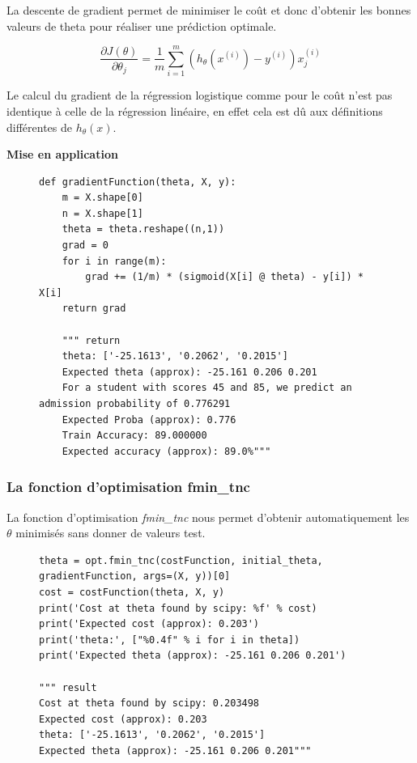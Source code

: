 La descente de gradient permet de minimiser le coût et donc d'obtenir les bonnes valeurs de theta pour réaliser une prédiction optimale.

\begin{equation}\label{eq:descente-gradient}
    \frac{\partial J(\theta)}{\partial \theta_j} = \frac{1}{m} \sum_{i=1}^{m} (h_\theta(x^{(i)}) - y^{(i)}) x_j^{(i)}
\end{equation}

\noindent
 Le calcul du gradient de la régression logistique comme pour le coût n'est pas identique à celle de la régression linéaire, en effet cela est dû aux définitions différentes de \( h_\theta (x) \).

\vspace{.5cm}
    \noindent
    \textbf{Mise en application}
    \vspace{.2cm}

\begin{figure}[!h]
\begin{verbatim}
def gradientFunction(theta, X, y):
    m = X.shape[0]  
    n = X.shape[1]   
    theta = theta.reshape((n,1)) 
    grad = 0
    for i in range(m):
        grad += (1/m) * (sigmoid(X[i] @ theta) - y[i]) * X[i]
    return grad

    """ return 
    theta: ['-25.1613', '0.2062', '0.2015']
    Expected theta (approx): -25.161 0.206 0.201
    For a student with scores 45 and 85, we predict an admission probability of 0.776291
    Expected Proba (approx): 0.776
    Train Accuracy: 89.000000
    Expected accuracy (approx): 89.0%"""
\end{verbatim}   
\end{figure}

\subsubsection{La fonction d'optimisation fmin\_tnc}

La fonction d'optimisation \textit{fmin\_tnc} nous permet d'obtenir automatiquement les $\theta$ minimisés sans donner de valeurs test. 

\begin{figure}[!h]
\begin{verbatim}
theta = opt.fmin_tnc(costFunction, initial_theta, gradientFunction, args=(X, y))[0]
cost = costFunction(theta, X, y)  
print('Cost at theta found by scipy: %f' % cost)
print('Expected cost (approx): 0.203')
print('theta:', ["%0.4f" % i for i in theta])
print('Expected theta (approx): -25.161 0.206 0.201')

""" result
Cost at theta found by scipy: 0.203498
Expected cost (approx): 0.203
theta: ['-25.1613', '0.2062', '0.2015']
Expected theta (approx): -25.161 0.206 0.201"""
\end{verbatim}   
\end{figure}

